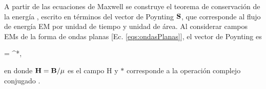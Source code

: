 A partir de las ecuaciones de Maxwell se construye el teorema de conservación de la energía \cite{griffiths2013electrodynamics}, escrito en términos del vector de Poynting $\vb{S}$, que corresponde al flujo de energía EM por unidad de tiempo y unidad de área. Al considerar campos EMs de la forma de ondas planas [Ec. \eqref{eqs:ondasPlanas}], el vector de Poynting es \vspace*{-.75em}
%
	\begin{tcolorbox}[title = Vector de Poynting considerando ondas planas, ams align]
	 = \times{}^*,  \label{eq:Poynting}
	\end{tcolorbox} \vspace*{-.75em}\noindent
%
en donde $\vb{H}=\vb{B}/\mu$ es el campo H y $*$ corresponde a la operación complejo conjugado \cite{hecht1998optics}.

